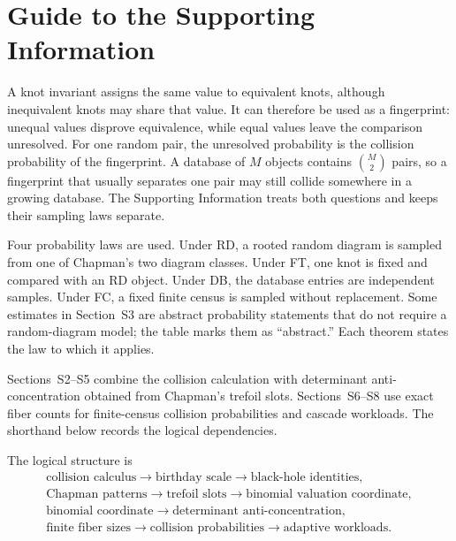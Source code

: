 \documentclass[9pt,twoside]{pnas-new}
\theoremstyle{definition}
\theoremstyle{remark}
\begin{document}
\section*{Guide to the Supporting Information}
\label{sec:si-guide}
A knot invariant assigns the same value to equivalent knots, although inequivalent knots may share that value. It can therefore be used as a fingerprint: unequal values disprove equivalence, while equal values leave the comparison unresolved. For one random pair, the unresolved probability is the collision probability of the fingerprint. A database of $M$ objects contains $\binom M2$ pairs, so a fingerprint that usually separates one pair may still collide somewhere in a growing database. The Supporting Information treats both questions and keeps their sampling laws separate.

Four probability laws are used. Under RD, a rooted random diagram is sampled from one of Chapman's two diagram classes. Under FT, one knot is fixed and compared with an RD object. Under DB, the database entries are independent samples. Under FC, a fixed finite census is sampled without replacement. Some estimates in Section~S3 are abstract probability statements that do not require a random-diagram model; the table marks them as ``abstract.'' Each theorem states the law to which it applies.

Sections~S2--S5 combine the collision calculation with determinant anti-concentration obtained from Chapman's trefoil slots. Sections~S6--S8 use exact fiber counts for finite-census collision probabilities and cascade workloads. The shorthand below records the logical dependencies.

The logical structure is
\[
\begin{gathered}
\text{collision calculus}\longrightarrow\text{birthday scale}
\longrightarrow\text{black-hole identities},\\
\text{Chapman patterns}\longrightarrow\text{trefoil slots}
\longrightarrow\text{binomial valuation coordinate},\\
\text{binomial coordinate}\longrightarrow\text{determinant anti-concentration},\\
\text{finite fiber sizes}\longrightarrow\text{collision probabilities}
\longrightarrow\text{adaptive workloads}.
\end{gathered}
\]
\end{document}

